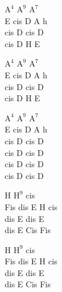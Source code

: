 \begin{chord}
    $\mathrm{A^4}$ $\mathrm{A^9}$ $\mathrm{A^7}$\\
    E cis D A h\\
    cis D cis D\\
    cis D H E

    $\mathrm{A^4}$ $\mathrm{A^9}$ $\mathrm{A^7}$\\
    E cis D A h\\
    cis D cis D\\
    cis D H E

    \hfill\break
    \hfill\break
    $\mathrm{A^4}$ $\mathrm{A^9}$ $\mathrm{A^7}$\\
    E cis D A h\\
    cis D cis D\\
    cis D cis D\\
    cis D cis D\\
    cis D cis D

    \hfill\break
    \hfill\break
    \hfill\break
    H $\mathrm{H^9}$ cis\\
    Fis dis E H cis\\
    dis E dis E\\
    dis E Cis Fis

    H $\mathrm{H^9}$ cis\\
    Fis dis E H cis\\
    dis E dis E\\
    dis E Cis Fis
\end{chord}
